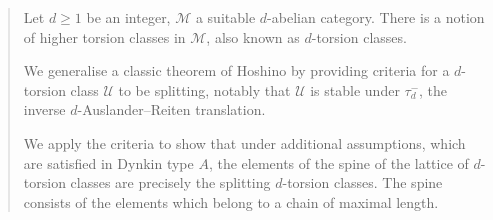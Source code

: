 \documentclass[12pt,reqno]{amsart}
\def\cM{\mathscr{M}}
\def\cU{\mathscr{U}}
\numberwithin{equation}{section}
\theoremstyle{definition}
\theoremstyle{theorem}
\theoremstyle{definition}
\begin{document}



\begin{abstract} 

Let $d \geqslant 1$ be an integer, $\cM$ a suitable $d$-abelian category.  There is a notion of higher torsion classes in $\cM\!$, also known as $d$-torsion classes.  

\medskip
\noindent
We generalise a classic theorem of Hoshino by providing criteria for a $d$-torsion class $\cU$ to be splitting,  notably that $\cU$ is stable under $\tau_d^-$, the inverse $d$-Auslander--Reiten translation.

\medskip
\noindent
We apply the criteria to show that under additional assumptions, which are satisfied in Dynkin type $A$, the elements of the spine of the lattice of $d$-torsion classes are precisely the splitting $d$-torsion classes.  The spine consists of the elements which belong to a chain of maximal length. 

\end{abstract}
\end{document}
